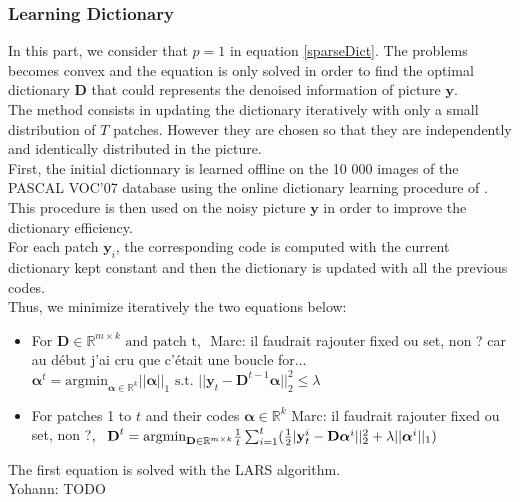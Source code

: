 \documentclass{ipol}
\newcommand{\psize}{m}
\newcommand{\dsize}{k}
\newcommand{\dict}{\textbf{D}}
\newcommand{\code}{\bm{\alpha}}
\newcommand{\pnorm}{p}
\newcommand{\noi}{\textbf{y}}
\newcommand{\RR}{\mathbb{R}}
\newcommand{\argmin}{\text{argmin}}
\begin{document}
\subsubsection{Learning Dictionary}

In this part, we consider that $\pnorm = 1$ in equation \eqref{sparseDict}. The problems becomes convex and the equation is only solved in order to find the optimal dictionary $\dict$ that could represents the denoised information of picture $\noi$.\\
The method consists in updating the dictionary iteratively with only a small distribution of $T$ patches. However they are chosen so that they are independently and identically distributed in the picture.\\
First, the initial dictionnary is learned offline on the 10 000 images of the PASCAL VOC'07 database using the  online dictionary learning procedure of \cite{onlineLearning}. This procedure is then used on the noisy picture $\noi$ in order to improve the dictionary efficiency.\\
For each patch $\noi_i$, the corresponding code is computed with the current dictionary kept constant and then the dictionary is updated with all the previous codes.\\
Thus, we minimize iteratively the two equations below:
\begin{itemize}
	\item For $\dict \in \RR^{\psize \times \dsize} \text{ and patch t, }$ {\color{red} Marc: il faudrait rajouter fixed ou set, non ? car au d\'ebut j'ai cru que c'\'etait une boucle for...} $\code^t = \argmin_{\code \in \RR^\dsize} ||\code||_1 \text{ s.t. } ||\noi_t - \dict^{t-1} \code||_2^2 \leq \lambda$
	\item For patches 1 to $t$ and their codes $\code \in \RR^\dsize ${\color{red} Marc: il faudrait rajouter fixed ou set, non ?}$, \ \ \dict^{t}= \argmin_{\dict \in \RR^{\psize \times \dsize}} \frac{1}{t} \sum_{i=1}^t (\frac{1}{2}|\textbf{\noi}_t^i - \dict \code^i||^2_2 + \lambda ||\code^i||_1)$
\end{itemize}
The first equation is solved with the LARS algorithm.\\
{\color{red} Yohann: TODO}
\end{document}
